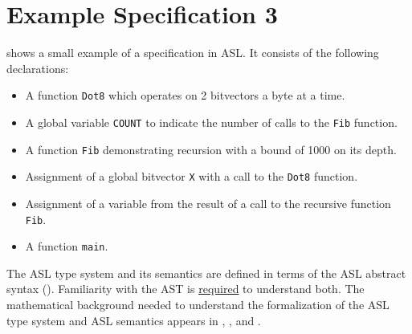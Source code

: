 \begin{center}

\end{center}

\section{Example Specification 3}
 shows a small example of a specification in ASL. It consists of the following declarations:
\begin{itemize}
    \item A function \texttt{Dot8} which operates on 2 bitvectors a byte at a time.
    \item A global variable \texttt{COUNT} to indicate the number of calls to the \texttt{Fib} function.
    \item A function \texttt{Fib} demonstrating recursion with a bound of 1000 on its depth.
    \item Assignment of a global bitvector \texttt{X} with a call to the \texttt{Dot8} function.
    \item Assignment of a variable from the result of a call to the recursive function \texttt{Fib}.
    \item A function \texttt{main}.
\end{itemize}

\begin{center}

\end{center}

The ASL type system and its semantics are defined in terms of
the ASL abstract syntax ().
Familiarity with the AST is \underline{required} to understand both.
The mathematical background needed to understand the formalization
of the ASL type system and ASL semantics appears in ,
, and .

